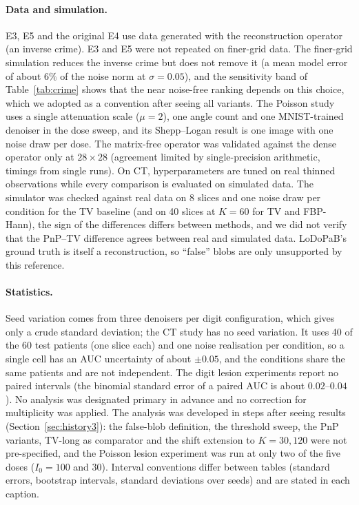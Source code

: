 \paragraph{Data and simulation.} E3, E5 and the original E4 use data generated with the reconstruction operator (an inverse crime). E3 and E5 were not repeated on finer-grid data. The finer-grid simulation reduces the inverse crime but does not remove it (a mean model error of about $6\%$ of the noise norm at $\sigma=0.05$), and the sensitivity band of Table~\ref{tab:crime} shows that the near noise-free ranking depends on this choice, which we adopted as a convention after seeing all variants. The Poisson study uses a single attenuation scale ($\mu=2$), one angle count and one MNIST-trained denoiser in the dose sweep, and its Shepp--Logan result is one image with one noise draw per dose. The matrix-free operator was validated against the dense operator only at $28\times28$ (agreement limited by single-precision arithmetic, timings from single runs). On CT, hyperparameters are tuned on real thinned observations while every comparison is evaluated on simulated data. The simulator was checked against real data on 8 slices and one noise draw per condition for the TV baseline (and on 40 slices at $K=60$ for TV and FBP-Hann), the sign of the differences differs between methods, and we did not verify that the PnP--TV difference agrees between real and simulated data.
LoDoPaB's ground truth is itself a reconstruction, so ``false'' blobs are only unsupported by this reference.

\paragraph{Statistics.} Seed variation comes from three denoisers per digit configuration, which gives only a crude standard deviation; the CT study has no seed variation. It uses 40 of the 60 test patients (one slice each) and one noise realisation per condition, so a single cell has an AUC uncertainty of about $\pm0.05$, and the conditions share the same patients and are not independent. The digit lesion experiments report no paired intervals (the binomial standard error of a paired AUC is about $0.02$--$0.04$). No analysis was designated primary in advance and no correction for multiplicity was applied. The analysis was developed in steps after seeing results (Section~\ref{sec:history3}): the false-blob definition, the threshold sweep, the PnP variants, TV-long as comparator and the shift extension to $K=30,120$ were not pre-specified, and the Poisson lesion experiment was run at only two of the five doses ($I_0=100$ and $30$). Interval conventions differ between tables (standard errors, bootstrap intervals, standard deviations over seeds) and are stated in each caption.

